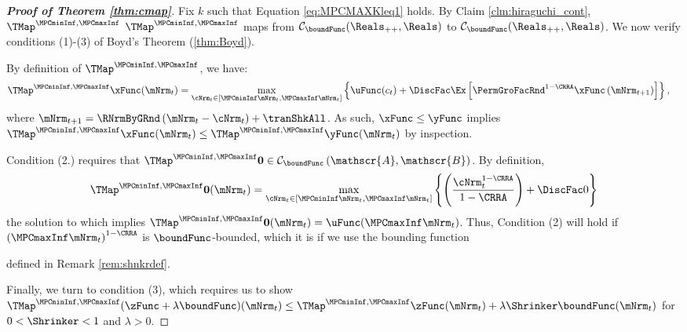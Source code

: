 \documentclass[\econtexRoot/BufferStockTheory]{subfiles}
\begin{document}
\begin{proof}[\textbf{Proof of Theorem \ref{thm:cmap}}]
Fix $k$ such that Equation \eqref{eq:MPCMAXKleq1} holds.
By Claim \ref{clm:hiraguchi_cont}, $\TMap^{\MPCminInf, \MPCmaxInf}$  $\TMap^{\MPCminInf, \MPCmaxInf}$ maps from $\mathcal{C}_{\boundFunc}(\Reals_{++},\Reals)$ to $\mathcal{C}_{\boundFunc}(\Reals_{++},\Reals)$.
We now verify conditions (1)-(3) of Boyd's Theorem (\ref{thm:Boyd}).


 By definition of $\TMap^{\MPCminInf, \MPCmaxInf}$, we have: 
\begin{equation}\begin{gathered}\begin{aligned}
  \TMap^{\MPCminInf, \MPCmaxInf}{\mathfrak{\xFunc}}(\mNrm_{t}) & = \underset{\cNrm_{t} \in
                                            [\MPCminInf \mNrm_{t}, \MPCmaxInf \mNrm_{t}]
                                            }\max \left\{
                                            \uFunc(c_{t})+\DiscFac \Ex\left[ {\PermGroFacRnd}^{1-\CRRA }{\mathfrak{\xFunc}}
                                            \left( {\mNrm}_{t+1}\right) \right] \right\},    \label{eq:condition1}
\end{aligned}\end{gathered}\end{equation}%
%
where ${\mNrm}_{t+1} = \RNrmByGRnd\left(\mNrm_{t} - \cNrm_{t}\right) + \tranShkAll$.
As such, ${\mathfrak{\xFunc}} \leq {\mathfrak{\yFunc}}$ implies $\TMap^{\MPCminInf, \MPCmaxInf}{\mathfrak{\xFunc}}(\mNrm_{t}) \leq \TMap^{\MPCminInf, \MPCmaxInf}{\mathfrak{\yFunc}} (\mNrm_{t})$ by inspection.

  Condition (2.) requires that $\TMap^{\MPCminInf, \MPCmaxInf}\mathbf{0}\in \mathcal{C}_{\boundFunc}\left(\mathscr{A},\mathscr{B}\right)$.
By definition,
\begin{equation*}
  \TMap^{\MPCminInf, \MPCmaxInf} \mathbf{0}(\mNrm_{t}) = \max_{\cNrm_{t} \in
    [\MPCminInf \mNrm_{t}, \MPCmaxInf \mNrm_{t}]
  }\left\{ \left( \frac{\cNrm_{t}^{1-\CRRA }}{1-\CRRA }\right) +\DiscFac 0\right\}
\end{equation*}
the solution to which implies
$\TMap^{\MPCminInf, \MPCmaxInf} \mathbf{0}(\mNrm_{t}) = \uFunc(\MPCmaxInf \mNrm_{t})$.
Thus, Condition (2)
will hold if ${(\MPCmaxInf \mNrm_{t})}^{1-\CRRA}$ is $\boundFunc$-bounded, which it is if we use the
bounding function

defined in Remark \ref{rem:shnkrdef}.


 Finally, we turn to condition (3), which requires us to show $\TMap^{\MPCminInf, \MPCmaxInf}({\zFunc} +\lambda\boundFunc
)(\mNrm_{t}) \leq\TMap^{\MPCminInf, \MPCmaxInf}{\zFunc}(\mNrm_{t}) +\lambda \Shrinker
\boundFunc(\mNrm_{t})$ for $0<\Shrinker<1$ and $\lambda>0$.


\end{proof}
\end{document}
